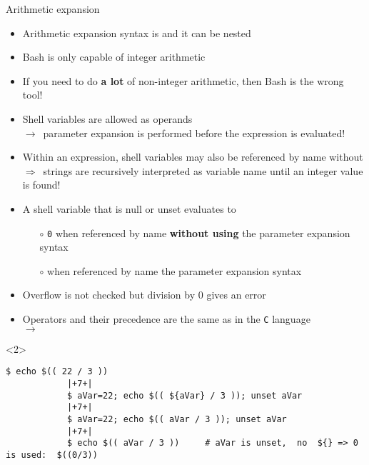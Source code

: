 \begin{frame}[fragile]{Arithmetic expansion}
    \vspace{-1mm}
    \begin{itemize}[<only@1>]
        \item Arithmetic expansion syntax is \PP{\texttt{\$((\ldots))}} and it can be nested
        \item \alert{Bash is only capable of integer arithmetic}
        \item If you need to do \textbf{a lot} of non-integer arithmetic, then Bash is the wrong tool!
        \item Shell variables are allowed as operands\\ $\to\,$ parameter expansion is performed before the expression is evaluated!
        \item Within an expression, shell variables may also be referenced by name without \PP{\texttt{\$\{\ldots\}}}\\
              $\Rightarrow\,$ strings are recursively interpreted as variable name until an integer value is found!
        \item A shell variable that is null or unset evaluates to
              \begin{itemize}
                  \item[$\circ$] \alert{\texttt{0}} when referenced by name \alert{\textbf{without using}} the parameter expansion syntax
                  \item[$\circ$]  when referenced by name  the parameter expansion syntax
              \end{itemize}
        \item Overflow is not checked but division by 0 gives an error
        \item Operators and their precedence are the same as in the \texttt{C} language\\ $\to\,$ 
    \end{itemize}
    \begin{onlyenv}<2>
        \begin{lstlisting}[style=MyBash, style=oddnumbers, style=smaller]
            $ echo $(( 22 / 3 ))
            |+7+|
            $ aVar=22; echo $(( ${aVar} / 3 )); unset aVar
            |+7+|
            $ aVar=22; echo $(( aVar / 3 )); unset aVar
            |+7+|
            $ echo $(( aVar / 3 ))     # aVar is unset,  no  ${} => 0 is used:  $((0/3))

\end{lstlisting}
\end{onlyenv}
\end{frame}
